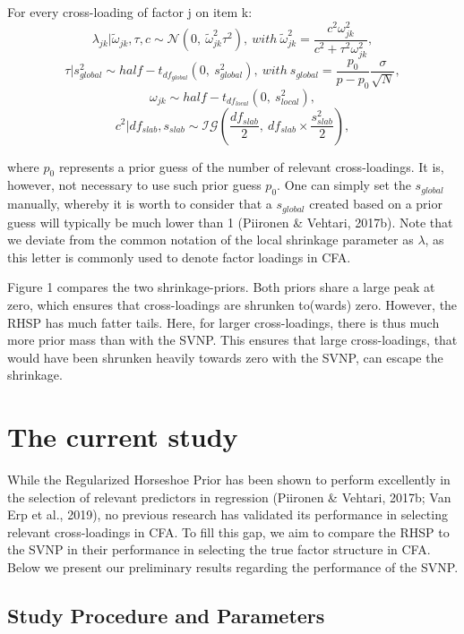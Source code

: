 \documentclass[
  english,
  man]{apa6}
\begin{document}
For every cross-loading of factor j on item k:
\[\lambda_{jk} | \tilde{\omega}_{jk}, \tau, c\sim \mathcal{N}(0, \ \tilde{\omega}^2_{jk} \tau^2), \ with \ \tilde{\omega}^2_{jk} = \frac{c^2\omega_{jk}^2}{c^2 + \tau^2 \omega_{jk}^2},\]
\[\tau | s_{global}^2 \sim half-t_{df_{global}}(0,\  s_{global}^2), \ with \  s_{global} = \frac{p_0}{p-p_0}\frac{\sigma}{\sqrt{N}},\]
\[\omega_{jk} \sim half-t_{df_{local}}(0, \ s_{local}^2),\]
\[c^2 | df_{slab}, s_{slab} \sim \mathcal{IG}(\frac{df_{slab}}{2}, \  df_{slab} \times \frac{s_{slab}^2}{2}),\]

where \(p_0\) represents a prior guess of the number of relevant cross-loadings. It is, however, not necessary to use such prior guess \(p_0\). One can simply set the \(s_{global}\) manually, whereby it is worth to consider that a \(s_{global}\) created based on a prior guess will typically be much lower than 1 (Piironen \& Vehtari, 2017b). Note that we deviate from the common notation of the local shrinkage parameter as \(\lambda\), as this letter is commonly used to denote factor loadings in CFA.

Figure 1 compares the two shrinkage-priors. Both priors share a large peak at zero, which ensures that cross-loadings are shrunken to(wards) zero. However, the RHSP has much fatter tails. Here, for larger cross-loadings, there is thus much more prior mass than with the SVNP. This ensures that large cross-loadings, that would have been shrunken heavily towards zero with the SVNP, can escape the shrinkage.

\hypertarget{the-current-study}{%
\section{The current study}\label{the-current-study}}

While the Regularized Horseshoe Prior has been shown to perform excellently in the selection of relevant predictors in regression (Piironen \& Vehtari, 2017b; Van Erp et al., 2019), no previous research has validated its performance in selecting relevant cross-loadings in CFA. To fill this gap, we aim to compare the RHSP to the SVNP in their performance in selecting the true factor structure in CFA. Below we present our preliminary results regarding the performance of the SVNP.

\hypertarget{study-procedure-and-parameters}{%
\subsection{Study Procedure and Parameters}\label{study-procedure-and-parameters}}
\end{document}
